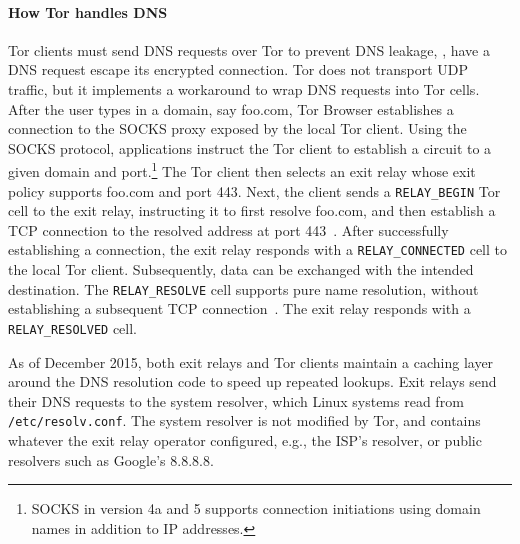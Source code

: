 \paragraph{How Tor handles DNS}
Tor clients must send DNS requests over Tor to prevent DNS leakage, \ie, have a
DNS request escape its encrypted connection.  Tor does not transport UDP
traffic, but it implements a workaround to wrap DNS requests into Tor cells.
After the user types in a domain, say foo.com, Tor Browser establishes a
connection to the SOCKS proxy exposed by the local Tor client.  Using the SOCKS
protocol, applications instruct the Tor client to establish a circuit to a given
domain and port.\footnote{SOCKS in version 4a and 5 supports connection
initiations using domain names in addition to IP addresses.} The Tor client then
selects an exit relay whose exit policy supports foo.com and port 443.  Next,
the client sends a \texttt{RELAY\_BEGIN} Tor cell to the exit relay, instructing
it to first resolve foo.com, and then establish a TCP connection to the resolved
address at port 443~\cite[\S~6.2]{tor-spec}.  After successfully establishing a
connection, the exit relay responds with a \texttt{RELAY\_CONNECTED} cell to the
local Tor client.  Subsequently, data can be exchanged with the intended
destination.  The \texttt{RELAY\_RESOLVE} cell supports pure name resolution,
without establishing a subsequent TCP connection~\cite[\S~6.4]{tor-spec}.  The
exit relay responds with a \texttt{RELAY\_RESOLVED} cell.

As of December 2015, both exit relays and Tor clients maintain a caching layer
around the DNS resolution code to speed up repeated lookups.  Exit relays send
their DNS requests to the system resolver, which Linux systems read from
\texttt{/etc/resolv.conf}.  The system resolver is not modified by Tor, and
contains whatever the exit relay operator configured, e.g., the ISP's resolver,
or public resolvers such as Google's 8.8.8.8.
